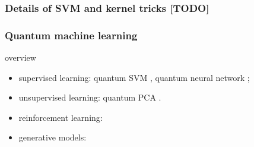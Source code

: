 \subsubsection{Details of SVM and kernel tricks [TODO]}


\subsubsection{Quantum machine learning}\label{sec:quantum_machine_learning}
overview \cite{biamonteQuantumMachineLearning2017}
\begin{itemize}
	\item supervised learning: quantum SVM \cite{rebentrostQuantumSupportVector2014}, quantum neural network  \cite{congQuantumConvolutionalNeural2019}; 
	\item unsupervised learning: quantum PCA \cite{lloydQuantumPrincipalComponent2014} \cite{tangQuantumPrincipalComponent2021}.
	\item reinforcement learning:
	\item generative models:
\end{itemize}

